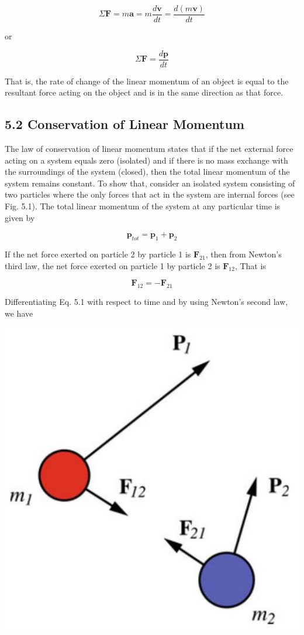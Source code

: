 \documentclass[10pt]{article}
\begin{document}
$$
\Sigma \mathbf{F}=m \mathbf{a}=m \frac{d \mathbf{v}}{d t}=\frac{d(m \mathbf{v})}{d t}
$$

or

$$
\Sigma \mathbf{F}=\frac{d \mathbf{p}}{d t}
$$

That is, the rate of change of the linear momentum of an object is equal to the resultant force acting on the object and is in the same direction as that force.

\subsection*{5.2 Conservation of Linear Momentum}
The law of conservation of linear momentum states that if the net external force acting on a system equals zero (isolated) and if there is no mass exchange with the surroundings of the system (closed), then the total linear momentum of the system remains constant. To show that, consider an isolated system consisting of two particles where the only forces that act in the system are internal forces (see Fig. 5.1). The total linear momentum of the system at any particular time is given by


\begin{equation*}
\mathbf{p}_{t o t}=\mathbf{p}_{1}+\mathbf{p}_{2} \tag{5.1}
\end{equation*}


If the net force exerted on particle 2 by particle 1 is $\mathbf{F}_{21}$, then from Newton's third law, the net force exerted on particle 1 by particle 2 is $\mathbf{F}_{12}$, That is

$$
\mathbf{F}_{12}=-\mathbf{F}_{21}
$$

Differentiating Eq. 5.1 with respect to time and by using Newton's second law, we have

\begin{center}
\includegraphics[max width=\textwidth]{2024_09_13_db1f357d2aad0a03eb2eg-083}
\end{center}
\end{document}
